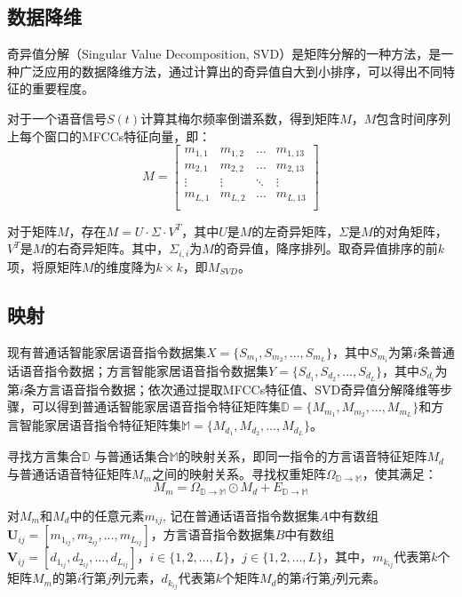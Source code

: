 \documentclass[lang=cn,cite=super]{elegantpaper}
\begin{document}
\subsection{数据降维}
奇异值分解（Singular Value Decomposition, SVD）是矩阵分解的一种方法，是一种广泛应用的数据降维方法，通过计算出的奇异值自大到小排序，可以得出不同特征的重要程度。

对于一个语音信号$S(t)$计算其梅尔频率倒谱系数，得到矩阵$M$，$M$包含时间序列上每个窗口的MFCCs特征向量，即：
\begin{equation}
    M = 
    \begin{bmatrix}
        m_{1,1} & m_{1,2} & \ldots & m_{1,13} \\
        m_{2,1} & m_{2,2} & \ldots & m_{2,13} \\
        \vdots & \vdots & \ddots & \vdots \\
        m_{L,1} & m_{L,2} & \ldots & m_{L,13}\\
    \end{bmatrix}
\end{equation}

对于矩阵$M$，存在$M = U \cdot \Sigma \cdot V^T$，其中$U$是$M$的左奇异矩阵，$\Sigma$是$M$的对角矩阵，$V^T$是$M$的右奇异矩阵。其中，$\Sigma_{i,i}$为$M$的奇异值，降序排列。取奇异值排序的前$k$项，将原矩阵$M$的维度降为$k \times k$，即$M_{SVD}$。
\subsection{映射}
现有普通话智能家居语音指令数据集$X=\{S_{m_1}, S_{m_2}, \ldots, S_{m_L}\}$，其中$S_{m_i}$为第$i$条普通话语音指令数据；方言智能家居语音指令数据集$Y=\{S_{d_1}, S_{d_2}, \ldots, S_{d_L}\}$，其中$S_{d_i}$为第$i$条方言语音指令数据；依次通过提取MFCCs特征值、SVD奇异值分解降维等步骤，可以得到普通话智能家居语音指令特征矩阵集$\mathbb{D} = \{ M_{m_1}, M_{m_2}, \ldots, M_{m_L}\}$和方言智能家居语音指令特征矩阵集$\mathbb{M} = \{ M_{d_1}, M_{d_2}, \ldots, M_{d_L}\}$。

寻找方言集合$\mathbb{D}$ 与普通话集合$\mathbb{M}$的映射关系，即同一指令的方言语音特征矩阵$M_d$与普通话语音特征矩阵$M_m$之间的映射关系。寻找权重矩阵$\Omega_{\mathbb{D}\rightarrow \mathbb{M}}$，使其满足：
\begin{equation}
    M_m = \Omega_{\mathbb{D}\rightarrow  \mathbb{M}} \odot M_d + E_{\mathbb{D}\rightarrow \mathbb {M}}
\end{equation}

对$M_m$和$M_d$中的任意元素$m_{ij}$, 记在普通话语音指令数据集$A$中有数组$\mathbf{U}_{ij} = [m_{1_{ij}}, m_{2_{ij}}, \ldots, m_{L_{ij}}]$，方言语音指令数据集$B$中有数组$\mathbf{V}_{ij} = [d_{1_{ij}}, d_{2_{ij}}, \ldots, d_{L_{ij}}]$，$i \in \{ 1, 2, \ldots, L\}$，$j \in \{ 1, 2, \ldots, L\}$，其中，$m_{k_{ij}}$代表第$k$个矩阵$M_m$的第$i$行第$j$列元素，$d_{k_{ij}}$代表第$k$个矩阵$M_d$的第$i$行第$j$列元素。
\end{document}

